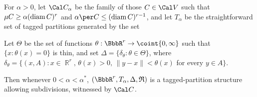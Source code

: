  For $\alpha>0$,
let $\Cal C_{\alpha}$ be the family of those $C\in\Cal V$ such that
$\mu C\ge\alpha(\mathop{\text{diam}} C)^r$ and $\alpha\per C\le(\diam C)^{r-1}$, and
let $T_{\alpha}$ be the straightforward set of tagged partitions
generated by the set


\noindent Let $\Theta$ be the set of functions
$\theta:\BbbR^r\to\coint{0,\infty}$ such that $\{x:\theta(x)=0\}$ is
thin,
and set $\Delta=\{\delta_{\theta}:\theta\in\Theta\}$, where
$\delta_{\theta}
=\{(x,A):x\in\BbbR^r,\,\theta(x)>0,\,\|y-x\|<\theta(x)$ for every
$y\in A\}$.

Then whenever $0<\alpha<\alpha^*$, $(\BbbR^r,T_{\alpha},\Delta,\frak R)$
is a tagged-partition structure allowing subdivisions, witnessed by
$\Cal C$.

